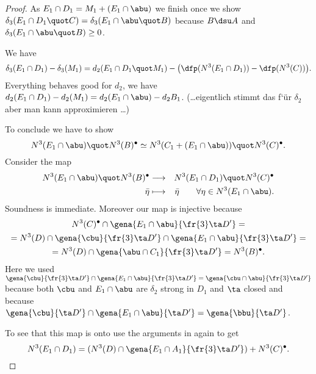 \begin{proof}
As $E_{1}\cap D_{1}=M_{1}+(E_{1}\cap \abu)$ we finish once we show
$\delta_{3}(E_{1}\cap D_{1}\quot C)=\delta_{3}(E_{1}\cap\abu\quot B)$ because
$B\dsu A$ and $\delta_{3}(E_{1}\cap \abu\quot B)\geq 0$.

We have
$$\delta_{3}(E_{1}\cap D_{1})-\delta_{3}(M_{1})=
d_{2}(E_{1}\cap D_{1}\quot M_{1})
-\big(\dfp(N^{3}(E_{1}\cap D_{1}))-\dfp(N^{3}(C))\big).$$
Everything behaves good for $d_{2}$, we have $d_{2}(E_{1}\cap D_{1})-d_{2}(M_{1})=
d_{2}(E_{1}\cap\abu)-d_{2}B_{1}$. (\dots eigentlich stimmt das f`\"ur $\delta_{2}$ aber
man kann approximieren \dots)

To conclude we have to show
$$N^{3}(E_{1}\cap\abu)\quot N^{3}(B)^{\bullet}\simeq
N^{3}(C_{1}+(E_{1}\cap \abu))\quot N^{3}(C)^{\bullet}.$$
Consider the map
\begin{eqnarray*}
N^{3}(E_{1}\cap \abu)\quot N^{3}(B)^{\bullet}&\longrightarrow&N^{3}(E_{1}\cap D_{1})\quot N^{3}(C)^{\bullet}\\
\bar\eta&\longmapsto&\bar\eta\quad\quad\forall\eta\in N^{3}(E_{1}\cap\abu).
\end{eqnarray*}
Soundness is immediate. Moreover our map is injective because
\begin{multline*}
N^{3}(C)^{\bullet}\cap\gena{E_{1}\cap \abu}{\fr{3}\ta D^{\prime}}=\\
=N^{3}(D)\cap\gena{\cbu}{\fr{3}\ta D^{\prime}}\cap\gena{E_{1}\cap \abu}{\fr{3}\ta D^{\prime}}=\\
=N^{3}(D)\cap\gena{\abu\cap C_{1}}{\fr{3}\ta D^{\prime}}=N^{3}(B)^{\bullet}.
\end{multline*}
Here we used $\gena{\cbu}{\fr{3}\ta D^{\prime}}\cap\gena{E_{1}\cap\abu}{\fr{3}\ta D^{\prime}}=
\gena{\cbu\cap\abu}{\fr{3}\ta D^{\prime}}$ because both $\cbu$ and $E_{1}\cap\abu$ are $\delta_{2}$ strong in $D_{1}$ and $\ta$ closed and because $\gena{\cbu}{\ta D^{\prime}}\cap\gena{E_{1}\cap\abu}{\ta D^{\prime}}=\gena{\bbu}{\ta D^{\prime}}$.

To see that this map is onto use the arguments in  again to get
$$N^{3}(E_{1}\cap D_{1})=(
N^{3}(D)\cap\gena{E_{1}\cap A_{1}}{\fr{3}\ta D^{\prime}})+N^{3}(C)^{\bullet}.$$


\end{proof}
